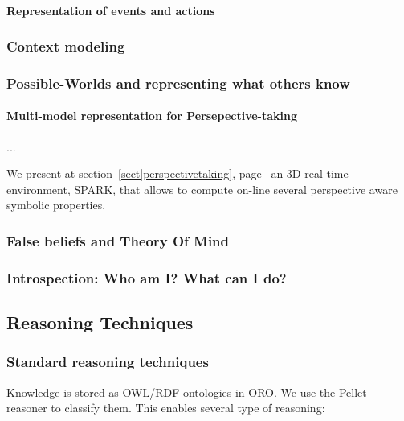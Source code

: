 \paragraph{Representation of events and actions}

\subsubsection{Context modeling}
\subsubsection{Possible-Worlds and representing what others know}

\paragraph{Multi-model representation for Persepective-taking}
\label{sect|alterite}

...

We present at section~\ref{sect|perspectivetaking}, page~\pageref{sect|perspectivetaking} an 3D real-time environment, SPARK, that allows to compute on-line several perspective aware symbolic properties.

\subsubsection{False beliefs and Theory Of Mind}
\label{sect|theory-of-mind}



\subsubsection{Introspection: Who am I? What can I do?}

\subsection{Reasoning Techniques}

\subsubsection{Standard reasoning techniques}


Knowledge is stored as OWL/RDF ontologies in ORO. We use the Pellet reasoner to
classify them. This enables several type of reasoning:

